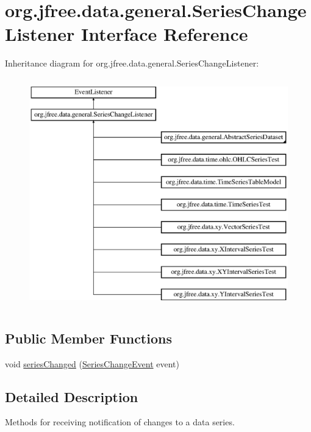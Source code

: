 \hypertarget{interfaceorg_1_1jfree_1_1data_1_1general_1_1_series_change_listener}{}\section{org.\+jfree.\+data.\+general.\+Series\+Change\+Listener Interface Reference}
\label{interfaceorg_1_1jfree_1_1data_1_1general_1_1_series_change_listener}
Inheritance diagram for org.\+jfree.\+data.\+general.\+Series\+Change\+Listener\+:\begin{figure}[H]
\begin{center}
\leavevmode
\includegraphics[height=10.000000cm]{interfaceorg_1_1jfree_1_1data_1_1general_1_1_series_change_listener}
\end{center}
\end{figure}
\subsection*{Public Member Functions}
\begin{DoxyCompactItemize}
\item 
void \mbox{\hyperlink{interfaceorg_1_1jfree_1_1data_1_1general_1_1_series_change_listener_a441fd65d1290b91e0184124be928ebf7}{series\+Changed}} (\mbox{\hyperlink{classorg_1_1jfree_1_1data_1_1general_1_1_series_change_event}{Series\+Change\+Event}} event)
\end{DoxyCompactItemize}


\subsection{Detailed Description}
Methods for receiving notification of changes to a data series. 

